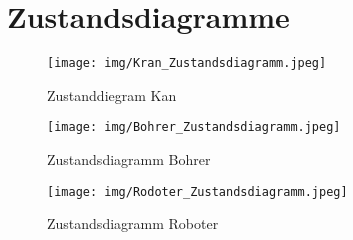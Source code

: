 \chapter{Zustandsdiagramme}
\label{ch:Zustandsdiagramme}


\begin{figure}[h]
	\begin{center}
		\texttt{[image: img/Kran\_Zustandsdiagramm.jpeg]}
		\caption{Zustanddiegram Kan}
		\label{Feinkonzept}
	\end{center}
\end{figure}
\begin{figure}[h]
	\begin{center}
		\texttt{[image: img/Bohrer\_Zustandsdiagramm.jpeg]}
		\caption{Zustandsdiagramm Bohrer}
		\label{Feinkonzept}
	\end{center}
\end{figure}
\begin{figure}[h]
	\begin{center}
		\texttt{[image: img/Rodoter\_Zustandsdiagramm.jpeg]}
		\caption{Zustandsdiagramm Roboter}
		\label{Feinkonzept}
	\end{center}
\end{figure}
